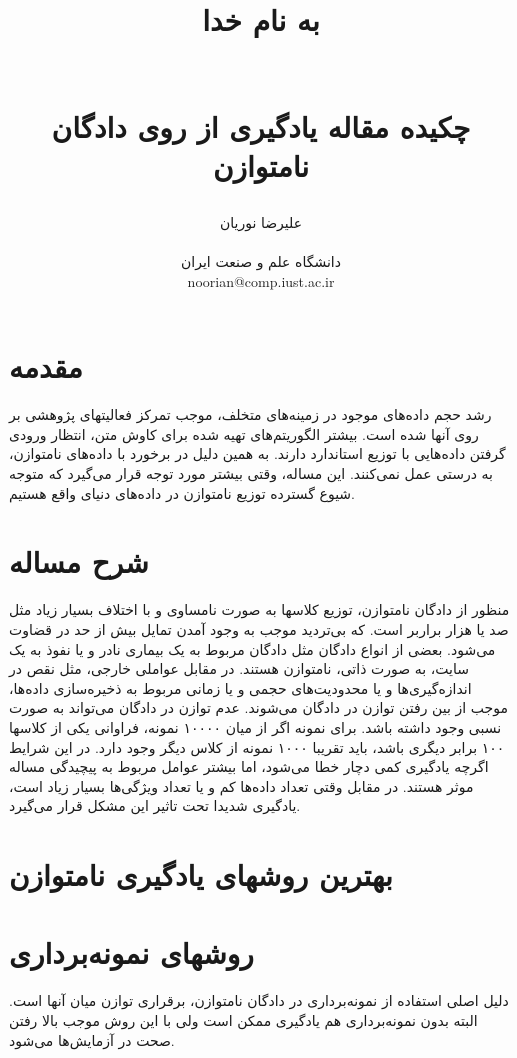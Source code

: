 \documentclass{article}
\title{ 
\begin{normalsize} به نام خدا \end{normalsize}
\\[7cm]
چکیده مقاله یادگیری از روی دادگان نامتوازن
\\[3cm]
}
\author{علیرضا نوریان
\\
\\ \small دانشگاه علم و صنعت ایران
\\ \small noorian@comp.iust.ac.ir
}
\begin{document}
\maketitle

\tableofcontents

\begin{abstract}

\end{abstract}

\section{مقدمه}
رشد حجم داده‌های موجود در زمینه‌های متخلف، موجب تمرکز فعالیتهای پژوهشی بر روی آنها شده است. بیشتر الگوریتم‌های تهیه شده برای کاوش متن، انتظار ورودی گرفتن داده‌هایی با توزیع استاندارد دارند. به همین دلیل در برخورد با داده‌های نامتوازن، به درستی عمل نمی‌کنند. این مساله، وقتی بیشتر مورد توجه قرار می‌گیرد که متوجه شیوع گسترده توزیع نامتوازن در داده‌های دنیای واقع هستیم.
\section{شرح مساله}
منظور از دادگان نامتوازن، توزیع کلاسها به صورت نامساوی و با اختلاف بسیار  زیاد مثل صد یا هزار براربر است. که بی‌تردید موجب به وجود آمدن تمایل بیش از حد در قضاوت می‌شود. بعضی از انواع دادگان مثل دادگان مربوط به یک بیماری نادر و یا نفوذ به یک سایت، به صورت ذاتی، نامتوازن هستند. در مقابل عواملی خارجی، مثل نقص در اندازه‌گیری‌ها و یا محدودیت‌های حجمی و یا زمانی مربوط به ذخیره‌سازی داده‌ها، موجب از بین رفتن توازن در دادگان می‌شوند.
عدم توازن در دادگان می‌تواند به صورت نسبی وجود داشته باشد. برای نمونه اگر از میان ۱۰۰۰۰ نمونه، فراوانی یکی از کلاسها ۱۰۰ برابر دیگری باشد، باید تقریبا ۱۰۰۰ نمونه از کلاس دیگر وجود دارد. در این شرایط اگرچه یادگیری کمی دچار خطا می‌شود، اما بیشتر عوامل مربوط به پیچیدگی مساله موثر هستند. در مقابل وقتی تعداد داده‌ها کم و یا تعداد ویژگی‌ها بسیار زیاد است، یادگیری شدیدا تحت تاثیر این مشکل قرار می‌گیرد.
\section{بهترین روشهای یادگیری نامتوازن}

\section{روشهای نمونه‌برداری}
دلیل اصلی استفاده از نمونه‌برداری در دادگان نامتوازن، برقراری توازن میان آنها است. البته بدون نمونه‌برداری هم یادگیری ممکن است ولی با این روش موجب بالا رفتن صحت در آزمایش‌ها می‌شود.
\end{document}
